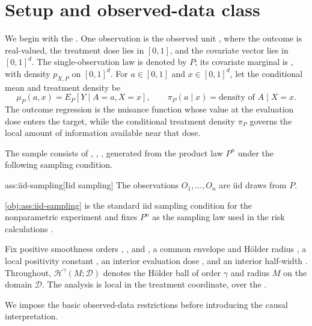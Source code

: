 \section{Setup and observed-data class}

We begin with the . One observation is the observed unit , where the outcome  is real-valued, the treatment dose  lies in \([0,1]\), and the covariate vector  lies in \([0,1]^d\). The single-observation law is denoted by \ensuremath{P}; its covariate marginal is , with density \(p_{X,P}\) on \([0,1]^d\). For \(a\in[0,1]\) and \(x\in[0,1]^d\), let the conditional mean and treatment density be
\[
\mu_P(a,x)=E_P[Y\mid A=a,X=x],
\qquad
\pi_P(a\mid x)=\text{density of }A\mid X=x .
\]
The outcome regression  is the nuisance function whose value at the evaluation dose enters the target, while the conditional treatment density \ensuremath{\pi_P} governs the local amount of information available near that dose.

The sample consists of , , , generated from the product law \(P^n\) under the following sampling condition.

\begin{assumptionv}{ass:iid-sampling}[Iid sampling]
The observations \(O_1,\ldots,O_n\) are iid draws from \(P\).
\end{assumptionv}

\cref{obj:ass:iid-sampling} is the standard iid sampling condition for the nonparametric experiment and fixes \(P^n\) as the sampling law used in the risk calculations \citep{tsybakov2009}.

Fix positive smoothness orders , , and , a common envelope and Hölder radius , a local positivity constant , an interior evaluation dose , and an interior half-width . Throughout, \(\mathcal H^\gamma(M;\mathcal D)\) denotes the Hölder ball of order \(\gamma\) and radius \(M\) on the domain \(\mathcal D\). The analysis is local in the treatment coordinate, over the .

We impose the basic observed-data restrictions before introducing the causal interpretation.

